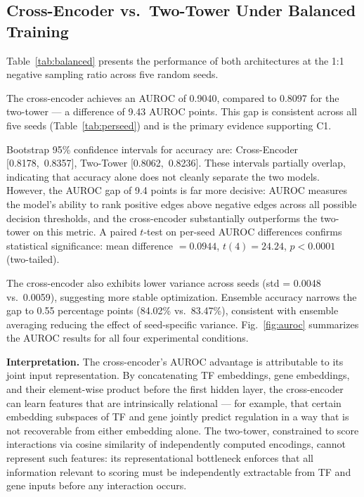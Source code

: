 \documentclass[journal]{IEEEtran}
\begin{document}
\subsection{Cross-Encoder vs.\ Two-Tower Under Balanced Training}
\label{ssec:h1}

Table~\ref{tab:balanced} presents the performance of both architectures at the
1:1 negative sampling ratio across five random seeds.

The cross-encoder achieves an AUROC of 0.9040, compared to 0.8097 for the
two-tower --- a difference of 9.43 AUROC points. This gap is consistent across
all five seeds (Table~\ref{tab:perseed}) and is the primary evidence supporting
C1.

Bootstrap 95\% confidence intervals for accuracy are: Cross-Encoder
[0.8178,~0.8357], Two-Tower [0.8062,~0.8236]. These intervals partially overlap,
indicating that accuracy alone does not cleanly separate the two models.
However, the AUROC gap of 9.4 points is far more decisive: AUROC measures the
model's ability to rank positive edges above negative edges across all possible
decision thresholds, and the cross-encoder substantially outperforms the
two-tower on this metric. A paired $t$-test on per-seed AUROC differences
confirms statistical significance: mean difference $= 0.0944$,
$t(4) = 24.24$, $p < 0.0001$ (two-tailed).

The cross-encoder also exhibits lower variance across seeds (std = 0.0048
vs.\ 0.0059), suggesting more stable optimization. Ensemble accuracy narrows
the gap to 0.55 percentage points (84.02\% vs.\ 83.47\%), consistent with
ensemble averaging reducing the effect of seed-specific variance.
Fig.~\ref{fig:auroc} summarizes the AUROC results for all four experimental
conditions.

\textbf{Interpretation.} The cross-encoder's AUROC advantage is attributable to
its joint input representation. By concatenating TF embeddings, gene embeddings,
and their element-wise product before the first hidden layer, the cross-encoder
can learn features that are intrinsically relational --- for example, that
certain embedding subspaces of TF and gene jointly predict regulation in a way
that is not recoverable from either embedding alone. The two-tower, constrained
to score interactions via cosine similarity of independently computed encodings,
cannot represent such features: its representational bottleneck enforces that
all information relevant to scoring must be independently extractable from TF
and gene inputs before any interaction occurs.
\end{document}

